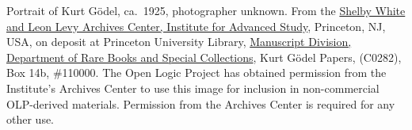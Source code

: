 Portrait of Kurt G\"odel, ca.~1925, photographer unknown. From
the \href{https://library.ias.edu/archives}{Shelby White and Leon Levy
Archives Center, Institute for Advanced Study}, Princeton, NJ, USA, on
deposit at Princeton University
Library, \href{http://rbsc.princeton.edu/divisions/manuscripts-division}{Manuscript
Division, Department of Rare Books and Special Collections}, Kurt
G\"odel Papers, (C0282), Box 14b, \#110000.  The Open Logic Project
has obtained permission from the Institute's Archives Center to use
this image for inclusion in non-commercial OLP-derived materials.
Permission from the Archives Center is required for any other use.

